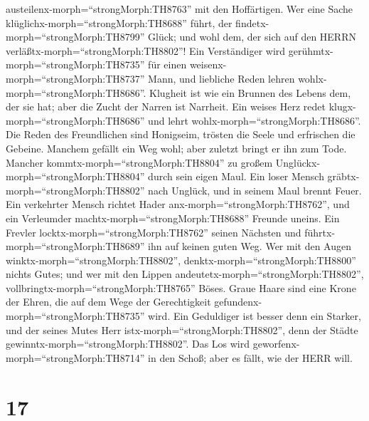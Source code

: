 austeilenx-morph=``strongMorph:TH8763'' mit den Hoffärtigen.
 Wer eine Sache klüglichx-morph=``strongMorph:TH8688''
führt, der findetx-morph=``strongMorph:TH8799'' Glück; und wohl dem, der
sich auf den HERRN verläßtx-morph=``strongMorph:TH8802''! 
Ein Verständiger wird gerühmtx-morph=``strongMorph:TH8735'' für einen
weisenx-morph=``strongMorph:TH8737'' Mann, und liebliche Reden lehren
wohlx-morph=``strongMorph:TH8686''.  Klugheit ist wie ein
Brunnen des Lebens dem, der sie hat; aber die Zucht der Narren ist
Narrheit.  Ein weises Herz redet
klugx-morph=``strongMorph:TH8686'' und lehrt
wohlx-morph=``strongMorph:TH8686''.  Die Reden des
Freundlichen sind Honigseim, trösten die Seele und erfrischen die
Gebeine.  Manchem gefällt ein Weg wohl; aber zuletzt bringt
er ihn zum Tode.  Mancher
kommtx-morph=``strongMorph:TH8804'' zu großem
Unglückx-morph=``strongMorph:TH8804'' durch sein eigen Maul.
 Ein loser Mensch gräbtx-morph=``strongMorph:TH8802'' nach
Unglück, und in seinem Maul brennt Feuer.  Ein verkehrter
Mensch richtet Hader anx-morph=``strongMorph:TH8762'', und ein
Verleumder machtx-morph=``strongMorph:TH8688'' Freunde uneins.
 Ein Frevler locktx-morph=``strongMorph:TH8762'' seinen
Nächsten und führtx-morph=``strongMorph:TH8689'' ihn auf keinen guten
Weg.  Wer mit den Augen
winktx-morph=``strongMorph:TH8802'', denktx-morph=``strongMorph:TH8800''
nichts Gutes; und wer mit den Lippen
andeutetx-morph=``strongMorph:TH8802'',
vollbringtx-morph=``strongMorph:TH8765'' Böses.  Graue
Haare sind eine Krone der Ehren, die auf dem Wege der Gerechtigkeit
gefundenx-morph=``strongMorph:TH8735'' wird.  Ein
Geduldiger ist besser denn ein Starker, und der seines Mutes Herr
istx-morph=``strongMorph:TH8802'', denn der Städte
gewinntx-morph=``strongMorph:TH8802''.  Das Los wird
geworfenx-morph=``strongMorph:TH8714'' in den Schoß; aber es fällt, wie
der HERR will.

\hypertarget{section-16}{%
\section{17}\label{section-16}}

